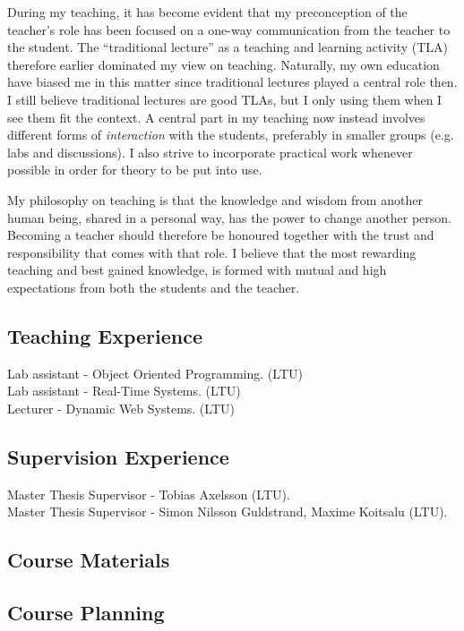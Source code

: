 \documentclass{article}
\begin{document}
During my teaching, it has become evident that my preconception of the teacher’s role has been focused on a one-way communication from the teacher to the student. The “traditional lecture” as a teaching and learning activity (TLA) therefore earlier dominated my view on teaching. Naturally, my own education have biased me in this matter since traditional lectures played a central role then. I still believe traditional lectures are good TLAs, but I only using them when I see them fit the context. A central part in my teaching now instead involves different forms of \textit{interaction} with the students, preferably in smaller groups (e.g. labs and discussions). I also strive to incorporate practical work whenever possible in order for theory to be put into use.

My philosophy on teaching is that the knowledge and wisdom from another human being, shared in a personal way, has the power to change another person. Becoming a teacher should therefore be honoured together with the trust and responsibility that comes with that role. I believe that the most rewarding teaching and best gained knowledge, is formed with mutual and high expectations from both the students and the teacher.

\subsection{Teaching Experience}
Lab assistant - Object Oriented Programming. (LTU) \\
Lab assistant - Real-Time Systems. (LTU) \\
Lecturer - Dynamic Web Systems. (LTU) \\

\subsection{Supervision Experience}
Master Thesis Supervisor - Tobias Axelsson (LTU). \\
Master Thesis Supervisor - Simon Nilsson Guldstrand, Maxime Koitsalu (LTU). \\

\subsection{Course Materials}

\subsection{Course Planning}
\end{document}
